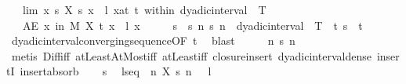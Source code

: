 \begin{isabellebody}
\ \ \ lim{\isacharcolon}{\kern0pt}\ {\isachardoublequoteopen}{\isasymAnd}x{\isachardot}{\kern0pt}\ {\isacharparenleft}{\kern0pt}{\isacharparenleft}{\kern0pt}{\isasymlambda}s{\isachardot}{\kern0pt}\ X\ s\ x{\isacharparenright}{\kern0pt}\ {\isasymlonglongrightarrow}\ {\isacharparenleft}{\kern0pt}l\ x{\isacharparenright}{\kern0pt}{\isacharparenright}{\kern0pt}{\isacharparenleft}{\kern0pt}at\ t\ within\ dyadic{\isacharunderscore}{\kern0pt}interval\ {}\ T{\isacharparenright}{\kern0pt}{\isachardoublequoteclose}\isanewline
\ \ \ {\isachardoublequoteopen}AE\ x\ in\ M{\isachardot}{\kern0pt}\ X\ t\ x\ {\isacharequal}{\kern0pt}\ l\ x{\isachardoublequoteclose}\isanewline
%
\isadelimproof
%
\endisadelimproof
%
\isatagproof
{}\isamarkupfalse%
\ \isanewline
\ \ \isamarkupfalse%
\ s\ \ s{\isacharcolon}{\kern0pt}\ {\isachardoublequoteopen}{\isasymforall}n{\isachardot}{\kern0pt}\ s\ n\ {\isasymin}\ dyadic{\isacharunderscore}{\kern0pt}interval\ {}\ T\ {\isacharminus}{\kern0pt}\ {\isacharbraceleft}{\kern0pt}t{\isacharbraceright}{\kern0pt}{\isachardoublequoteclose}\ {\isachardoublequoteopen}s\ {\isasymlonglonglongrightarrow}\ t{\isachardoublequoteclose}\isanewline
\ \ \ \ \isamarkupfalse%
\ dyadic{\isacharunderscore}{\kern0pt}interval{\isacharunderscore}{\kern0pt}converging{\isacharunderscore}{\kern0pt}sequence{\isacharbrackleft}{\kern0pt}OF\ t{\isacharbrackright}{\kern0pt}\ \isamarkupfalse%
\ blast\isanewline
\ \ \isamarkupfalse%
\ \isamarkupfalse%
\ {\isachardoublequoteopen}{\isasymforall}n{\isachardot}{\kern0pt}\ s\ n\ {\isasymin}\ {\isacharbraceleft}{\kern0pt}{}{\isachardot}{\kern0pt}{\isachardot}{\kern0pt}{\isacharbraceright}{\kern0pt}{\isachardoublequoteclose}\isanewline
\ \ \ \ \isamarkupfalse%
\ {\isacharparenleft}{\kern0pt}metis\ Diff{\isacharunderscore}{\kern0pt}iff\ atLeastAtMost{\isacharunderscore}{\kern0pt}iff\ atLeast{\isacharunderscore}{\kern0pt}iff\ closure{\isacharunderscore}{\kern0pt}insert\ dyadic{\isacharunderscore}{\kern0pt}interval{\isacharunderscore}{\kern0pt}dense\ insertI{}\ insert{\isacharunderscore}{\kern0pt}absorb{\isacharparenright}{\kern0pt}\isanewline
\ \ \isamarkupfalse%
\ s\ \isamarkupfalse%
\ l{\isacharunderscore}{\kern0pt}seq{\isacharcolon}{\kern0pt}\ \ {\isachardoublequoteopen}{\isacharparenleft}{\kern0pt}{\isasymlambda}n{\isachardot}{\kern0pt}\ X\ {\isacharparenleft}{\kern0pt}s\ n{\isacharparenright}{\kern0pt}\ {\isasymomega}{\isacharparenright}{\kern0pt}\ {\isasymlonglonglongrightarrow}\ l\ {\isasymomega}{\isachardoublequoteclose}\ \ {\isasymomega}\isanewline

\end{isabellebody}
